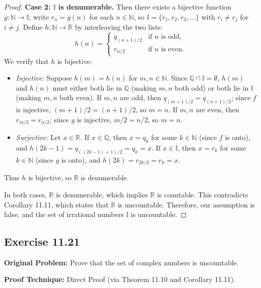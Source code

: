 \documentclass[11pt, letterpaper]{article}
\theoremstyle{definition}
\theoremstyle{remark}
\begin{document}
\begin{proof}
\textbf{Case 2: $\mathbb{I}$ is denumerable.}
Then there exists a bijective function $g : \mathbb{N} \to \mathbb{I}$; write $r_n = g(n)$ for each $n \in \mathbb{N}$, so $\mathbb{I} = \{r_1, r_2, r_3, \dots\}$ with $r_i \neq r_j$ for $i \neq j$. Define $h : \mathbb{N} \to \mathbb{R}$ by interleaving the two lists:
\[
h(n) = \begin{cases}
q_{(n+1)/2} & \text{if } n \text{ is odd}, \\
r_{n/2} & \text{if } n \text{ is even}.
\end{cases}
\]
We verify that $h$ is bijective:
\begin{itemize}
    \item \emph{Injective:} Suppose $h(m) = h(n)$ for $m, n \in \mathbb{N}$. Since $\mathbb{Q} \cap \mathbb{I} = \emptyset$, $h(m)$ and $h(n)$ must either both lie in $\mathbb{Q}$ (making $m, n$ both odd) or both lie in $\mathbb{I}$ (making $m, n$ both even). If $m, n$ are odd, then $q_{(m+1)/2} = q_{(n+1)/2}$; since $f$ is injective, $(m+1)/2 = (n+1)/2$, so $m = n$. If $m, n$ are even, then $r_{m/2} = r_{n/2}$; since $g$ is injective, $m/2 = n/2$, so $m = n$.
    \item \emph{Surjective:} Let $x \in \mathbb{R}$. If $x \in \mathbb{Q}$, then $x = q_k$ for some $k \in \mathbb{N}$ (since $f$ is onto), and $h(2k - 1) = q_{((2k-1)+1)/2} = q_k = x$. If $x \in \mathbb{I}$, then $x = r_k$ for some $k \in \mathbb{N}$ (since $g$ is onto), and $h(2k) = r_{2k/2} = r_k = x$.
\end{itemize}
Thus $h$ is bijective, so $\mathbb{R}$ is denumerable.

In both cases, $\mathbb{R}$ is denumerable, which implies $\mathbb{R}$ is countable. This contradicts Corollary 11.11, which states that $\mathbb{R}$ is uncountable. Therefore, our assumption is false, and the set of irrational numbers $\mathbb{I}$ is uncountable.
\end{proof}

\subsection{Exercise 11.21}

\textbf{Original Problem:} Prove that the set of complex numbers is uncountable.

\textbf{Proof Technique:} Direct Proof (via Theorem 11.10 and Corollary 11.11).
\end{document}
